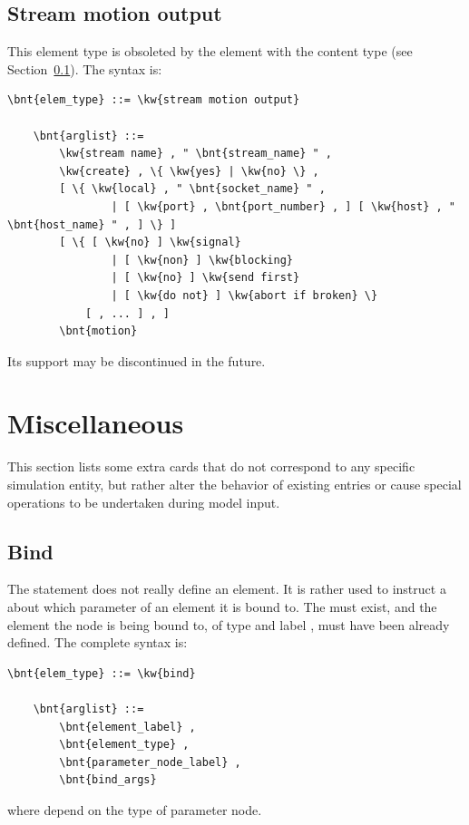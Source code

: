 \subsection{Stream motion output}\label{sec:EL:OUTELEM:STREAM_MOTION_OUTPUT}
This element type is obsoleted by the  element
with the  content type
(see Section~\ref{sec:EL:OUTELEM:STREAM_MOTION_OUTPUT}).
The syntax is:
\begin{Verbatim}[commandchars=\\\{\}]
    \bnt{elem_type} ::= \kw{stream motion output}

    \bnt{arglist} ::= 
        \kw{stream name} , " \bnt{stream_name} " ,
        \kw{create} , \{ \kw{yes} | \kw{no} \} ,
        [ \{ \kw{local} , " \bnt{socket_name} " ,
                | [ \kw{port} , \bnt{port_number} , ] [ \kw{host} , " \bnt{host_name} " , ] \} ]
        [ \{ [ \kw{no} ] \kw{signal}
                | [ \kw{non} ] \kw{blocking}
                | [ \kw{no} ] \kw{send first}
                | [ \kw{do not} ] \kw{abort if broken} \}
            [ , ... ] , ]
        \bnt{motion}
\end{Verbatim}
Its support may be discontinued in the future.





\section{Miscellaneous}
This section lists some extra cards that do not correspond to any
specific simulation entity, but rather alter the behavior 
of existing entries or cause special operations to be undertaken
during model input.



\subsection{Bind}\label{sec:EL:MISC:BIND}
The statement  does not really define an element.
It is rather used to instruct a
about which parameter of an element it is bound to.
The  must exist, and the element the node 
is being bound to, of type  and label ,
must have been already defined.
The complete syntax is:
\begin{Verbatim}[commandchars=\\\{\}]
    \bnt{elem_type} ::= \kw{bind}

    \bnt{arglist} ::=
        \bnt{element_label} ,
        \bnt{element_type} ,
        \bnt{parameter_node_label} , 
        \bnt{bind_args}
\end{Verbatim}
where  depend on the type of parameter node.

